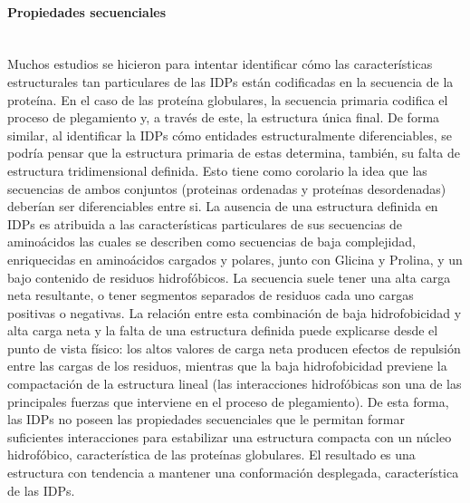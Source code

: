 \paragraph{Propiedades secuenciales} \hspace{0pt} \\
\indent Muchos estudios se hicieron para intentar identificar cómo las características  estructurales tan particulares de las IDPs están codificadas en la secuencia de la proteína.
En el caso de las proteína globulares, la secuencia primaria codifica el proceso de plegamiento y, a través de este, la estructura única final. 
De forma similar, al identificar la IDPs cómo entidades estructuralmente diferenciables, se podría pensar que la estructura primaria de estas determina, también, su falta de estructura tridimensional definida.
Esto tiene como corolario la idea que las secuencias de ambos conjuntos (proteinas ordenadas y proteínas desordenadas) deberían ser diferenciables entre si.
La ausencia de una estructura definida en IDPs es atribuida a las características particulares de sus secuencias de aminoácidos las cuales se describen como secuencias de baja complejidad, enriquecidas en aminoácidos 
cargados y polares, junto con Glicina y Prolina, y un bajo contenido de residuos hidrofóbicos. 
La secuencia suele tener una alta carga neta resultante, o tener segmentos separados de residuos cada uno cargas positivas o negativas.
La relación entre esta combinación de baja hidrofobicidad y alta carga neta y la falta de una estructura definida puede explicarse desde el punto de vista físico:
los altos valores de carga neta producen efectos de repulsión entre las cargas de los residuos, mientras que la baja hidrofobicidad previene la compactación de la estructura lineal 
(las interacciones hidrofóbicas son una de las principales fuerzas que interviene en el proceso de plegamiento).
De esta forma, las IDPs no poseen las propiedades secuenciales que le permitan formar suficientes interacciones para estabilizar una estructura compacta con un núcleo hidrofóbico, característica de las proteínas globulares.
El resultado es una estructura con tendencia a mantener una conformación desplegada, característica de las IDPs.

